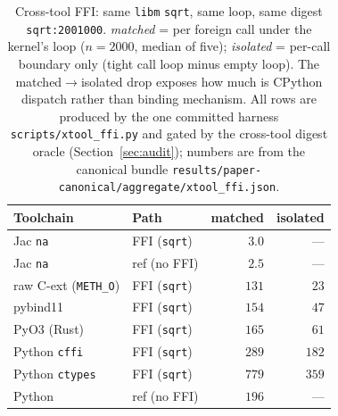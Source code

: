 \documentclass[conference]{IEEEtran}
\newcommand{\code}[1]{\texttt{#1}}
\begin{document}
\begin{table}[t]
\caption{Cross-tool FFI: same \code{libm} \code{sqrt}, same loop, same digest
\code{sqrt:2001000}. \emph{matched} = per foreign call under the kernel's loop
($n{=}2000$, median of five); \emph{isolated} = per-call boundary only (tight call
loop minus empty loop). The matched$\to$isolated drop exposes how much is
CPython dispatch rather than binding mechanism. All rows are produced by the one
committed harness \code{scripts/xtool\_ffi.py} and gated by the cross-tool
digest oracle (Section~\ref{sec:audit}); numbers are from the canonical bundle
\code{results/paper-canonical/aggregate/xtool\_ffi.json}.}
\label{tab:xtool}
\centering
\small
\begin{tabular}{@{}llrr@{}}
\toprule
Toolchain & Path & matched & isolated \\
\midrule
Jac \code{na}        & FFI (\code{sqrt})  & $3.0$ & --- \\
Jac \code{na}        & ref (no FFI)       & $2.5$ & --- \\
raw C-ext (\code{METH\_O}) & FFI (\code{sqrt}) & $131$ & $23$ \\
pybind11             & FFI (\code{sqrt})  & $154$ & $47$ \\
PyO3 (Rust)          & FFI (\code{sqrt})  & $165$ & $61$ \\
Python \code{cffi}   & FFI (\code{sqrt})  & $289$ & $182$ \\
Python \code{ctypes} & FFI (\code{sqrt})  & $779$ & $359$ \\
Python               & ref (no FFI)       & $196$ & --- \\
\bottomrule
\end{tabular}
\end{table}
\end{document}
